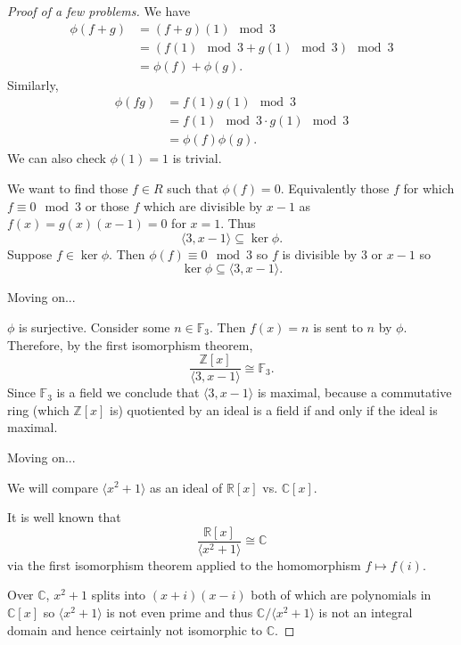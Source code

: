 \begin{proof}[Proof of a few problems]
    We have 
    \begin{align*}
        \phi(f+g) 
        &= (f+g)(1) \mod 3 \\ 
        &= (f(1) \mod 3 + g(1) \mod 3) \mod 3 \\ 
        &= \phi(f) + \phi(g). 
    \end{align*} 
    Similarly, 
    \begin{align*}
        \phi(fg) 
        &= f(1)g(1) \mod 3 \\ 
        &= f(1) \mod 3 \cdot g(1) \mod 3 \\ 
        &= \phi(f)\phi(g).
    \end{align*}
    We can also check $\phi(1) = 1$ is trivial.

    We want to find those $f \in R$ such 
    that $\phi(f) = 0$. Equivalently those 
    $f$ for which $f \equiv 0 \mod 3$ or 
    those $f$ which are divisible by $x-1$ 
    as $f(x) = g(x)(x-1) = 0$ for $x = 1$. 
    Thus 
    \[
        \langle 3, x-1\rangle \subseteq \ker \phi.
    \]
    Suppose $f \in \ker \phi$. 
    Then $\phi(f) \equiv 0 \mod 3$ so $f$ is 
    divisible by $3$ or $x-1$ so 
    \[
        \ker \phi \subseteq \langle 3, x-1\rangle. 
    \]

    Moving on... 

    \medskip 

    $\phi$ is surjective. Consider some 
    $n \in \mathbb F_3$. Then $f(x) = n$ 
    is sent to $n$ by $\phi$. 
    Therefore, by the first isomorphism theorem, 
    \[
        \frac{\mathbb Z[x]}{\langle 3, x-1\rangle} 
        \cong \mathbb F_3.
    \]
    Since $\mathbb F_3$ is a field we conclude 
    that $\langle 3,x-1 \rangle$ is maximal, because 
    a commutative ring (which $\mathbb Z[x]$ is) quotiented 
    by an ideal is a field if and only if 
    the ideal is maximal. 

    Moving on... 

    \medskip

    We will compare $\langle x^2 + 1 \rangle$ as an 
    ideal of $\mathbb R[x]$ vs. $\mathbb C[x]$.

    It is well known that 
    \[
        \frac{\mathbb R[x]}{\langle x^2 + 1 \rangle} 
        \cong \mathbb C 
    \]
    via the first isomorphism theorem applied to 
    the homomorphism $f \mapsto f(i)$.

    Over $\mathbb C$, $x^2 + 1$ splits 
    into $(x + i)(x-i)$ both of which 
    are polynomials in $\mathbb C[x]$ so 
    $\langle x^2 + 1 \rangle$ is not even 
    prime and thus $\mathbb C/\langle x^2 + 1 \rangle$ is 
    not an integral domain and hence ceirtainly not 
    isomorphic to $\mathbb C$.
\end{proof}


